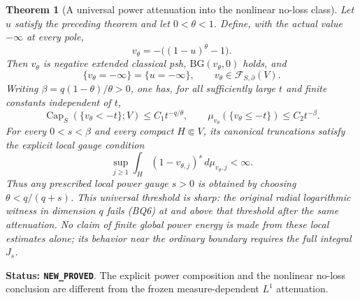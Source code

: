 \documentclass[11pt,a4paper]{article}
\numberwithin{equation}{section}
\newtheorem{theorem}{Theorem}[section]
\theoremstyle{definition}
\theoremstyle{remark}
\begin{document}
\begin{theorem}[A universal power attenuation into the nonlinear no-loss class]
\label{thm:r11-power-attenuation-no-loss}
Let $u$ satisfy the preceding theorem and let $0<\theta<1$.
Define, with the actual value $-\infty$ at every pole,
\[
                  v_\theta=-\bigl((1-u)^\theta-1\bigr).
 \tag{BQ3}
\]
Then $v_\theta$ is negative extended classical psh,
$\mathrm{BG}(v_\theta,0)$ holds, and
\[
 \{v_\theta=-\infty\}=\{u=-\infty\},\qquad
            v_\theta\in\mathcal F_{S,\partial}(V).
 \tag{BQ4}
\]
Writing $\beta=q(1-\theta)/\theta>0$, one has, for all
sufficiently large $t$ and finite constants independent of $t$,
\[
 \operatorname{Cap}_S(\{v_\theta<-t\};V)
               \leq C_1t^{-q/\theta},\qquad
 \mu_{v_\theta}(\{v_\theta\leq-t\})\leq C_2t^{-\beta}.
 \tag{BQ5}
\]
For every $0<s<\beta$ and every compact $H\Subset V$, its
canonical truncations satisfy the explicit local gauge condition
\[
 \sup_{j\geq1}\int_H(1-v_{\theta,j})^s\,d\mu_{v_\theta,j}
                                                   <\infty.
 \tag{BQ6}
\]
Thus any prescribed local power gauge $s>0$ is obtained by
choosing $\theta<q/(q+s)$. This universal threshold is sharp:
the original radial logarithmic witness in dimension $q$ fails
(BQ6) at and above that threshold after the same attenuation.
No claim of finite \emph{global} power energy is made from these
local estimates alone; its behavior near the ordinary boundary
requires the full integral $J_s$.
\end{theorem}

\noindent\textbf{Status: \texttt{NEW\_PROVED}}. The explicit
power composition and the nonlinear no-loss conclusion are
different from the frozen measure-dependent $L^1$ attenuation.
\end{document}
